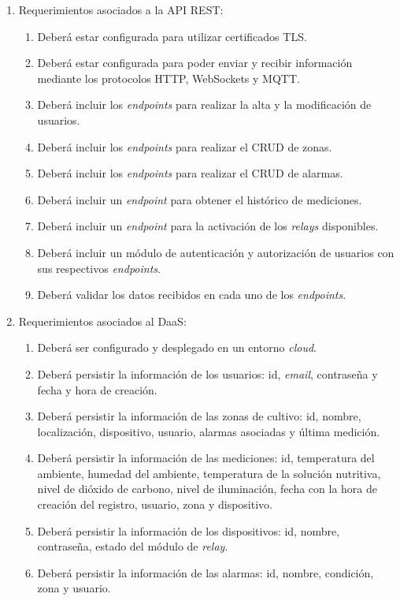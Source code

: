 \begin{enumerate}
	\item Requerimientos asociados a la API REST:
		\begin{enumerate}
			\item Deberá estar configurada para utilizar certificados TLS.
			\item Deberá estar configurada para poder enviar y recibir información mediante los protocolos HTTP, WebSockets y MQTT.
			\item Deberá incluir los \textit{endpoints} para realizar la alta y la modificación de usuarios.
			\item Deberá incluir los \textit{endpoints} para realizar el CRUD de zonas.
			\item Deberá incluir los \textit{endpoints} para realizar el CRUD de alarmas.
			\item Deberá incluir un \textit{endpoint} para obtener el histórico de mediciones.
			\item Deberá incluir un \textit{endpoint} para la activación de los \textit{relays} \citep{WEBSITE:RELAY} disponibles.
			\item Deberá incluir un módulo de autenticación y autorización de usuarios con sus respectivos \textit{endpoints}.
			\item Deberá validar los datos recibidos en cada uno de los \textit{endpoints}.
		\end{enumerate}
		
	\item Requerimientos asociados al DaaS:
		\begin{enumerate}
			\item Deberá ser configurado y desplegado en un entorno \textit{cloud}.
			\item Deberá persistir la información de los usuarios: id, \textit{email}, contraseña y fecha y hora de creación.
			\item Deberá persistir la información de las zonas de cultivo: id, nombre, localización, dispositivo, usuario, alarmas asociadas y última medición.
			\item Deberá persistir la información de las mediciones: id, temperatura del ambiente, humedad del ambiente, temperatura de la solución nutritiva, nivel de dióxido de carbono, nivel de iluminación, fecha con la hora de creación del registro, usuario, zona y dispositivo.
			\item Deberá persistir la información de los dispositivos: id, nombre, contraseña, estado del módulo de \textit{relay}.
			\item Deberá persistir la información de las alarmas: id, nombre, condición, zona y usuario.
		\end{enumerate}
		

\end{enumerate}
